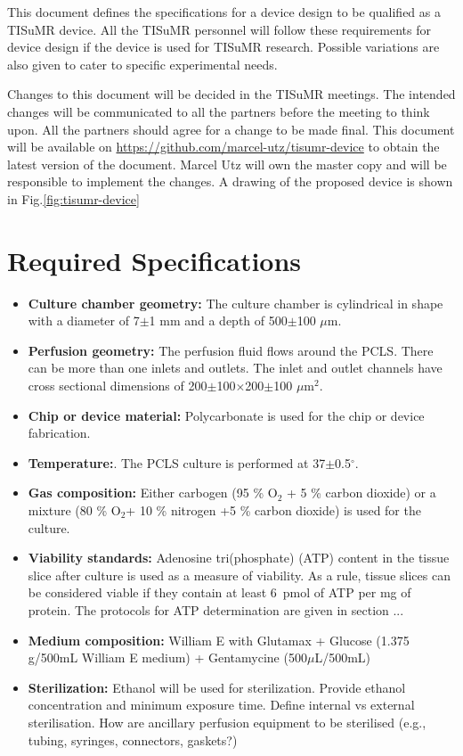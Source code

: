 \documentclass{EU-report}
\begin{document}
This document defines the specifications for a device design to be qualified as
a TISuMR device. All the TISuMR personnel will follow these requirements for
device design if the device is used for TISuMR research. Possible variations are
also given to cater to specific experimental needs.

Changes to this document will be decided in the TISuMR meetings. The intended
changes will be communicated to all the partners before the meeting to think
upon. All the partners should agree for a change to be made final. This document
will be available on
\url{https://github.com/marcel-utz/tisumr-device} to obtain the latest version
of the document. Marcel Utz will own the master copy and will be responsible to
implement the changes. A drawing of the proposed device is shown in
Fig.\ref{fig:tisumr-device}

\section{Required Specifications}
\begin{itemize}
\item \textbf{Culture chamber geometry:} The culture chamber is cylindrical in
shape with a diameter of 7$\pm$1 mm and a depth of 500$\pm$100 $\mu$m.
\item \textbf{Perfusion geometry:} The perfusion fluid flows around the PCLS.
There can be more than one inlets and outlets. The inlet and outlet channels
have cross sectional dimensions of 200$\pm$100$\times$200$\pm$100 $\mu$m$^2$.
\item \textbf{Chip or device material:} Polycarbonate is used for the chip or
device fabrication.
\item \textbf{Temperature:}. The PCLS culture is performed at
37$\pm$0.5$^{\circ}$.
\item \textbf{Gas composition:} Either carbogen (95 \% O$_2$ + 5 \% carbon
dioxide) or a mixture (80 \% O$_2$+ 10 \% nitrogen +5 \% carbon dioxide) is used
for the culture.
\item \textbf{Viability standards:} Adenosine tri(phosphate) (ATP) content in
the tissue slice after culture is used as a measure of viability. As a rule,
tissue slices can be considered viable if they contain at least 6~pmol of ATP
per mg of protein. {\color{red}The protocols for ATP determination are given in section ...}
\item \textbf{Medium composition:} William E  with Glutamax + Glucose (1.375
g/500mL William E medium) + Gentamycine (500$\mu$L/500mL)
\item \textbf{Sterilization:} Ethanol will be used for sterilization.
{\color{red} Provide ethanol concentration and minimum exposure time.
Define internal vs external sterilisation. How are ancillary perfusion
equipment to be sterilised (e.g., tubing, syringes, connectors, gaskets?)}
\end{itemize}
\end{document}

